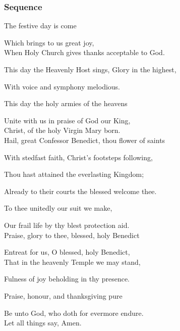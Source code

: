\subsubsection{Sequence}
\begin{multicols}{2}
\begin{hangparas}{1.25em}{1}

The festive day is come

Which brings to us great joy,\\

When Holy Church gives thanks acceptable to God.

This day the Heavenly Host sings, Glory in the highest,

With voice and symphony melodious.

This day the holy armies of the heavens

Unite with us in praise of God our King,\\

Christ, of the holy Virgin Mary born.\\

Hail, great Confessor Benedict, thou flower of saints

With stedfast faith, Christ's footsteps following,

Thou hast attained the everlasting Kingdom;

Already to their courts the blessed welcome thee.

To thee unitedly our suit we make,

Our frail life by thy blest protection aid.\\

Praise, glory to thee, blessed, holy Benedict

Entreat for us, O blessed, holy Benedict,\\

That in the heavenly Temple we may stand,

Fulness of joy beholding in thy presence.

Praise, honour, and thanksgiving pure

Be unto God, who doth for evermore endure.\\

Let all things say, Amen.
\end{hangparas}
\end{multicols}


